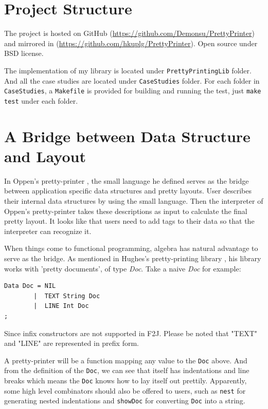\section{Project Structure}
The project is hosted on GitHub (\url{https://github.com/Demonsu/PrettyPrinter}) and mirrored in (\url{https://github.com/hkuplg/PrettyPrinter}). Open source under BSD license.

The implementation of my library is located under \texttt{PrettyPrintingLib} folder. And all the case studies are located under \texttt{CaseStudies} folder. For each folder in \texttt{CaseStudies}, a \texttt{Makefile} is provided for building and running the test, just \texttt{make test} under each folder.



\section{A Bridge between Data Structure and Layout}

In Oppen's pretty-printer \cite{oppen1980prettyprinting}, the small language he defined serves as the bridge between application specific data structures and pretty layouts. User describes their internal data structures by using the small language. Then the interpreter of Oppen's pretty-printer takes these descriptions as input to calculate the final pretty layout. It looks like that users need to add tags to their data so that the interpreter can recognize it.

When things come to functional programming, algebra has natural advantage to serve as the bridge. As mentioned in Hughes's pretty-printing library \cite{hughes1995design}, his library works with 'pretty documents', of type \textit{Doc}. Take a naive \textit{Doc} for example:

\begin{lstlisting}
Data Doc = NIL
        |  TEXT String Doc
        |  LINE Int Doc
;
\end{lstlisting}

\begin{remark}
Since infix constructors are not supported in F2J. Please be noted that "TEXT" and "LINE" are represented in prefix form.
\end{remark}

A pretty-printer will be a function mapping any value to the \texttt{Doc} above. And from the definition of the \texttt{Doc}, we can see that itself has indentations and line breaks which means the \texttt{Doc} knows how to lay itself out prettily. Apparently, some high level combinators should also be offered to users, such as \texttt{nest} for generating nested indentations and \texttt{showDoc} for converting \texttt{Doc} into a string.

